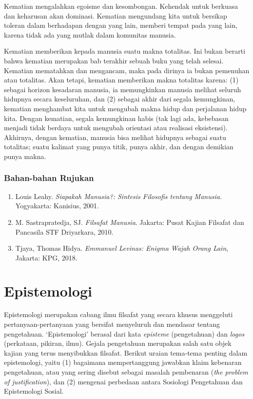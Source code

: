 \documentclass[11pt,twoside,a5paper,openany]{memoir}
\def\tightlist{}
\begin{document}
Kematian mengalahkan egoisme dan kesombongan. Kehendak untuk berkuasa
dan keharusan akan dominasi. Kematian mengundang kita untuk bersikap
toleran dalam berhadapan dengan yang lain, memberi tempat pada yang
lain, karena tidak ada yang mutlak dalam komunitas manusia.

Kematian memberikan kepada manusia suatu makna totalitas. Ini bukan
berarti bahwa kematian merupakan bab terakhir sebuah buku yang telah
selesai. Kematian mematahkan dan mengancam, maka pada dirinya ia bukan
pemenuhan atau totalitas. Akan tetapi, kematian memberikan makna
totalitas karena: (1) sebagai horizon kesadaran manusia, ia memungkinkan
manusia melihat seluruh hidupnya secara keseluruhan, dan (2) sebagai
akhir dari segala kemungkinan, kematian menghambat kita untuk mengubah
makna hidup dan perjalanan hidup kita. Dengan kematian, segala
kemungkinan habis (tak lagi ada, kebebasan menjadi tidak berdaya untuk
mengubah orientasi atau realisasi eksistensi). Akhirnya, dengan
kematian, manusia bisa melihat hidupnya sebagai suatu totalitas; suatu
kalimat yang punya titik, punya akhir, dan dengan demikian punya makna.

\hypertarget{bahan-bahan-rujukan}{%
\subsection{Bahan-bahan Rujukan}\label{bahan-bahan-rujukan}}

\begin{enumerate}
\def\labelenumi{\arabic{enumi}.}
\tightlist
\item
  Louis Leahy. \emph{Siapakah Manusia?: Sintesis Filosofis tentang
  Manusia}. Yogyakarta: Kanisius, 2001.
\item
  M. Sastrapratedja, SJ. \emph{Filsafat Manusia}. Jakarta: Pusat Kajian
  Filsafat dan Pancasila STF Driyarkara, 2010.
\item
  Tjaya, Thomas Hidya. \emph{Emmanuel Levinas: Enigma Wajah Orang Lain},
  Jakarta: KPG, 2018.
\end{enumerate}

\hypertarget{epistemologi}{%
\chapter{Epistemologi}\label{epistemologi}}

Epistemologi merupakan cabang ilmu filsafat yang secara khusus
menggeluti pertanyaan-pertanyaan yang bersifat menyeluruh dan mendasar
tentang pengetahuan. `Epistemologi' berasal dari kata \emph{episteme}
(pengetahuan) dan \emph{logos} (perkataan, pikiran, ilmu). Gejala
pengetahuan merupakan salah satu objek kajian yang terus menyibukkan
filsafat. Berikut uraian tema-tema penting dalam epistemologi, yaitu (1)
bagaimana mempertanggung jawabkan klaim kebenaran pengetahuan, atau yang
sering disebut sebagai masalah pembenaran (\emph{the problem of
justification}), dan (2) mengenai perbedaan antara Sosiologi Pengetahuan
dan Epistemologi Sosial.
\end{document}
